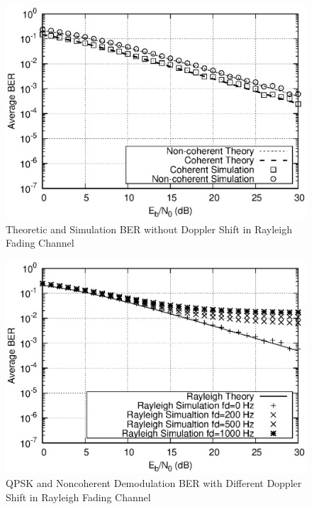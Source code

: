 \documentclass[technicalreport]{ieicej}
\begin{document}
\begin{figure}[H]
	\begin{center}
		\vspace{0cm}
		\includegraphics[width=\linewidth,clip]{fig/without_fd.eps}
		\caption{Theoretic and Simulation BER without Doppler Shift in Rayleigh Fading Channel}
		\label{fig:sample}
	\end{center}
\end{figure}

\begin{figure}[H]
	\begin{center}
		\vspace{0cm}
		\includegraphics[width=\linewidth,clip]{fig/with_fd.eps}
		\caption{QPSK and Noncoherent Demodulation BER with Different Doppler Shift in Rayleigh Fading Channel}
		\label{fig:sample}
	\end{center}
\end{figure}
\end{document}
